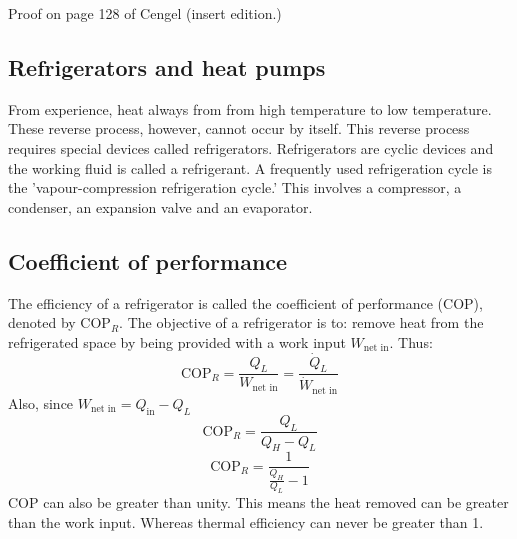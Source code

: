 \documentclass[class=report, crop=false, 12pt,a4paper]{standalone}
\begin{document}
Proof on page 128 of Cengel (insert edition.)
\subsection{Refrigerators and heat pumps}
From experience, heat always from from high temperature to low temperature. These reverse process, however, cannot occur by itself. This reverse process requires special devices called refrigerators. Refrigerators are cyclic devices and the working fluid is called a refrigerant. A frequently used refrigeration cycle is the 'vapour-compression refrigeration cycle.' This involves a compressor, a condenser, an expansion valve and an evaporator.
\subsection{Coefficient of performance}
The efficiency of a refrigerator is called the coefficient of performance (COP), denoted by \(\textrm{COP}_R\). The objective of a refrigerator is to: remove heat from the refrigerated space by being provided with a work input \(W_{\textrm{net in}}\). Thus:
\[ \textrm{COP}_R = \frac{Q_L}{W_{\textrm{net in}}} = \frac{\dot{Q}_L}{\dot{W}_{\textrm{net in}}} \]
Also, since \(W_{\textrm{net in}} = Q_{\textrm{in}} - Q_L\)
\[ \textrm{COP}_R = \frac{Q_L}{Q_H-Q_L} \]
\[ \textrm{COP}_R = \frac{1}{\frac{Q_H}{Q_L} - 1}\]
COP can also be greater than unity. This means the heat removed can be greater than the work input. Whereas thermal efficiency can never be greater than 1. 
\end{document}
